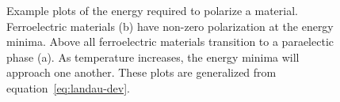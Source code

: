 \begin{figure}[tb]
   \centering
   \caption[Energy vs. Polarization Plots for FE and PE Materials]%
   		{Example plots of the energy required to polarize a material. Ferroelectric materials (b) have %
		non-zero polarization at the energy minima. Above \Tc{} all ferroelectric materials transition %
		to a paraelectic phase (a). As temperature increases, the energy minima will approach one %
		another. These plots are generalized from equation~\vref{eq:landau-dev}.}
   \label{fig:EvP}
\end{figure}

